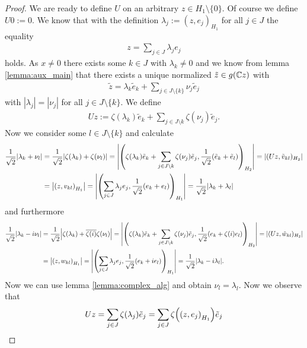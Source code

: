\begin{proof}
	We are ready to define $U$ on an arbitrary $z \in H_1 \setminus \{0\}$. Of course we define $U0 := 0$.  We know that with the definition $\lambda_j := (z,e_j)_{H_1}$ for all $j \in J$ the equality
	\begin{align*}
		z = \sum_{j \in J} \lambda_j e_j
	\end{align*}
	holds. As $x \neq 0$ there exists some $k \in J$ with $\lambda_k \neq 0$ and we know from lemma \ref{lemma:aux_main} that there exists a unique normalized $\tilde{z} \in g(\mathbb{C} z)$ with
	\begin{align*}
		\tilde{z} = \lambda_k \tilde{e}_k + \sum_{j \in J \setminus \{k\}} \nu_j \tilde{e}_j
	\end{align*} 
	with $|\lambda_j| = |\nu_j|$ for all $j \in J \setminus \{k\}$. We define
	\begin{align*}
		Uz := \zeta(\lambda_k) \tilde{e}_k + \sum_{j \in J \setminus{k}} \zeta(\nu_j) \tilde{e}_j.
	\end{align*}
	Now we consider some $l \in J \setminus \{k\}$ and calculate
	\begin{align*}
		\frac{1}{\sqrt{2}}{\left | \lambda_k + \nu_l \right |} &= \frac{1}{\sqrt{2}} {\left | \zeta(\lambda_k) + \zeta(\nu_l) \right |} = {\left | {\left ( \zeta(\lambda_k) \tilde{e}_k + \sum_{j \in J \setminus{k}} \zeta(\nu_j) \tilde{e}_j, \frac{1}{\sqrt{2}}(\tilde{e}_k + \tilde{e}_l) \right )}_{H_2} \right |} = |(Uz, \tilde{v}_{kl})_{H_2}| \\
		&= {\left | {\left ( z, v_{kl} \right )}_{H_1} \right |} = {\left | {\left ( \sum_{j \in J} \lambda_j e_j, \frac{1}{\sqrt{2}}(e_k + e_l) \right )}_{H_1} \right |} = \frac{1}{\sqrt{2}} {\left | \lambda_k + \lambda_l \right |} 
	\end{align*}
	and furthermore
	\begin{align*}
		\frac{1}{\sqrt{2}}{\left | \lambda_k - i \nu_l \right |} &= \frac{1}{\sqrt{2}} {\left | \zeta(\lambda_k) + \overline{\zeta(i)} \zeta(\nu_l) \right |} = {\left | {\left ( \zeta(\lambda_k) \tilde{e}_k + \sum_{j \in J \setminus{k}} \zeta(\nu_j) \tilde{e}_j, \frac{1}{\sqrt{2}}(e_k + \zeta(i) e_l) \right )}_{H_2} \right |} = |(Uz, \tilde{w}_{kl})_{H_2}| \\
		&= {\left | {\left ( z, w_{kl} \right )}_{H_1} \right |} = {\left | {\left ( \sum_{j \in J} \lambda_j e_j, \frac{1}{\sqrt{2}}(e_k + ie_l) \right )}_{H_1} \right |} = \frac{1}{\sqrt{2}} {\left | \lambda_k - i \lambda_l \right |}.
	\end{align*}
	Now we can use lemma \ref{lemma:complex_alg} and obtain $\nu_l = \lambda_l$. Now we observe that 
	\begin{align*}
		Uz = \sum_{j \in J} \zeta(\lambda_j) \tilde{e}_j = \sum_{j \in J} \zeta\pbraces{\pbraces{z, e_j}_{H_1}}\tilde{e}_j

\end{align*}
\end{proof}
